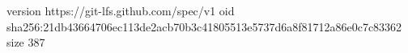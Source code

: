 version https://git-lfs.github.com/spec/v1
oid sha256:21db43664706ec113de2acb70b3c41805513e5737d6a8f81712a86e0c7c83362
size 387
